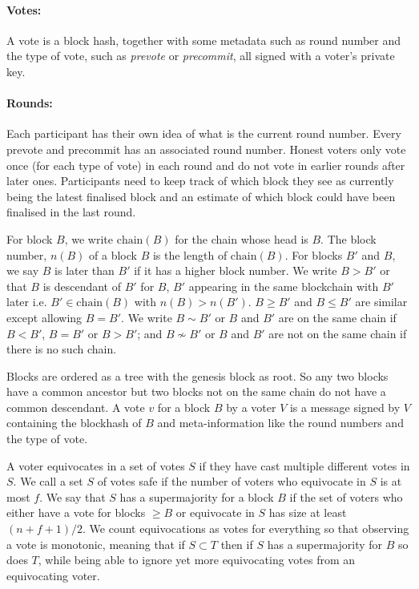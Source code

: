 \documentclass{article}
\begin{document}
\paragraph{Votes:}A vote is a block hash, together with some metadata such as round number and the type of vote, such as {\em prevote} or {\em precommit}, all signed with a voter's private key.

\paragraph{Rounds:}Each participant has their own idea of what is the current round number. Every prevote and precommit has an associated round number. Honest voters only vote once (for each type of vote) in each round and do not vote in earlier rounds after later ones.
Participants need to keep track of which block they see as currently being the latest finalised block and an estimate of which block could have been finalised in the last round. 


For block $B$, we write $\mathrm{chain}(B)$ for the chain whose head is $B$. The block number, $n(B)$ of a block $B$ is the length of $\mathrm{chain}(B)$.
For blocks $B'$ and $B$, we say $B$ is later than $B'$ if it has a higher block number.
We write $B > B'$ or that $B$ is descendant of $B'$ for $B$, $B'$ appearing in the same blockchain with $B'$ later i.e. $B' \in \mathrm{chain}(B)$ with $n(B) > n(B')$.
$B \geq B'$ and $B \leq B'$ are similar except allowing $B = B'$.
We write $B \sim B'$ or $B$ and $B'$ are on the same chain if $B<B'$, $B=B'$ or $B> B'$; and $B \nsim B'$ or $B$ and $B'$ are not on the same chain if there is no such chain.

Blocks are ordered as a tree with the genesis block as root. So any two blocks have a common ancestor but two blocks not on the same chain do not have a common descendant.
A vote $v$ for a block $B$ by a voter $V$ is a message signed by $V$ containing the blockhash of $B$ and meta-information like the round numbers and the type of vote. 

A voter equivocates in a set of votes $S$ if they have cast multiple different votes in $S$. We call a set $S$ of votes safe if the number of voters who equivocate in $S$ is at most $f$. We say that $S$ has a supermajority for a block $B$ if the set of voters who either have a vote for blocks $\geq B$ or equivocate in $S$ has size at least $(n+f+1)/2$.  We count equivocations as votes for everything so that observing a vote is monotonic, meaning that if $S \subset T$ then if $S$ has a supermajority for $B$ so does $T$, while being able to ignore yet more equivocating votes from an equivocating voter.
\end{document}
